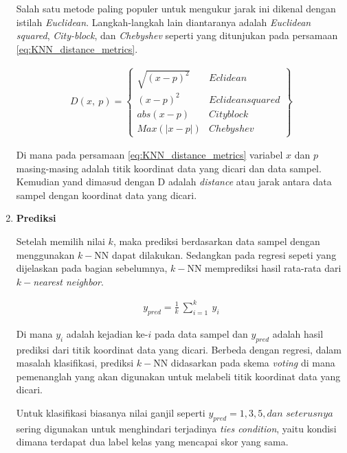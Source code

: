 \begin{subs}
\begin{enumerate}[label=\textbf{\alph*).}]
		Salah satu metode paling populer untuk mengukur jarak ini dikenal dengan istilah \textit{Euclidean}. Langkah-langkah lain diantaranya adalah \textit{Euclidean squared}, \textit{City-block}, dan \textit{Chebyshev} seperti yang ditunjukan pada persamaan \ref{eq:KNN_distance_metrics}.
		\vspace{1ex}
		
		\begin{equation}\label{eq:KNN_distance_metrics}
		\begin{split}
		D(x,\ p) =
		\begin{Bmatrix}
		\sqrt{(x - p)^{2}} & Eclidean\\
		(x - p)^{2} & Eclidean squared\\
		abs(x - p) & Cityblock\\
		Max(|x - p|) & Chebyshev
		\end{Bmatrix}
		\end{split}
		\end{equation}
		
		Di mana pada persamaan \ref{eq:KNN_distance_metrics} variabel $x$ dan $p$ masing-masing adalah titik koordinat data yang dicari dan data sampel. Kemudian yand dimasud dengan D adalah \textit{distance} atau jarak antara data sampel dengan koordinat data yang dicari.
		\vspace{1ex}
		
		\item \textbf{Prediksi}
		
		Setelah memilih nilai $k$, maka prediksi berdasarkan data sampel dengan menggunakan $k-$NN dapat dilakukan. Sedangkan pada regresi sepeti yang dijelaskan pada bagian sebelumnya, $k-$NN memprediksi hasil rata-rata dari $k-$\textit{nearest neighbor}.
		
		\begin{equation}\label{eq: KNN_prediction}
		\begin{split}
		y_{pred} = \frac{1}{k}\ \sum_{i = 1}^{k}\ y_{i}
		\end{split}
		\end{equation}
		
		Di mana $y_{i}$ adalah kejadian ke-$i$ pada data sampel dan $y_{pred}$ adalah hasil prediksi dari titik koordinat data yang dicari. Berbeda dengan regresi, dalam masalah klasifikasi, prediksi $k-$NN didasarkan pada skema \textit{voting} di mana pemenanglah yang akan digunakan untuk melabeli titik koordinat data yang dicari.
		\vspace{1ex}
		
		Untuk klasifikasi biasanya nilai ganjil seperti $y_{pred} = 1, 3, 5, dan$ $seterusnya$ sering digunakan untuk menghindari terjadinya \textit{ties condition}, yaitu kondisi dimana terdapat dua label kelas yang mencapai skor yang sama.
		\vspace{1ex}
		

\end{enumerate}
\end{subs}
